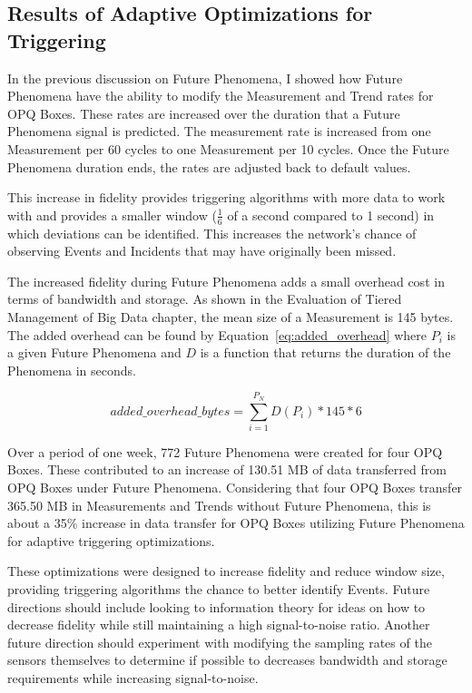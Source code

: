\subsection{Results of Adaptive Optimizations for Triggering}\label{subsec:results-of-adaptive-optimizations-for-triggering}

In the previous discussion on Future Phenomena, I showed how Future Phenomena have the ability to modify the Measurement and Trend rates for OPQ Boxes. These rates are increased over the duration that a Future Phenomena signal is predicted. The measurement rate is increased from one Measurement per 60 cycles to one Measurement per 10 cycles. Once the Future Phenomena duration ends, the rates are adjusted back to default values.

This increase in fidelity provides triggering algorithms with more data to work with and provides a smaller window ($\frac{1}{6}$ of a second compared to 1 second) in which deviations can be identified. This increases the network's chance of observing Events and Incidents that may have originally been missed.

The increased fidelity during Future Phenomena adds a small overhead cost in terms of bandwidth and storage. As shown in the Evaluation of Tiered Management of Big Data chapter, the mean size of a Measurement is 145 bytes. The added overhead can be found by Equation~\ref{eq:added_overhead} where $P_i$ is a given Future Phenomena and $D$ is a function that returns the duration of the Phenomena in seconds.

\begin{equation}
    added\_overhead\_bytes = \sum_{i=1}^{P_{N}} D(P_i) * 145 * 6
    \label{eq:added_overhead}
\end{equation}

Over a period of one week, 772 Future Phenomena were created for four OPQ Boxes. These contributed to an increase of 130.51 MB of data transferred from OPQ Boxes under Future Phenomena. Considering that four OPQ Boxes transfer 365.50 MB in Measurements and Trends without Future Phenomena, this is about a 35\% increase in data transfer for OPQ Boxes utilizing Future Phenomena for adaptive triggering optimizations.

These optimizations were designed to increase fidelity and reduce window size, providing triggering algorithms the chance to better identify Events. Future directions should include looking to information theory for ideas on how to decrease fidelity while still maintaining a high signal-to-noise ratio. Another future direction should experiment with modifying the sampling rates of the sensors themselves to determine if possible to decreases bandwidth and storage requirements while increasing signal-to-noise.

